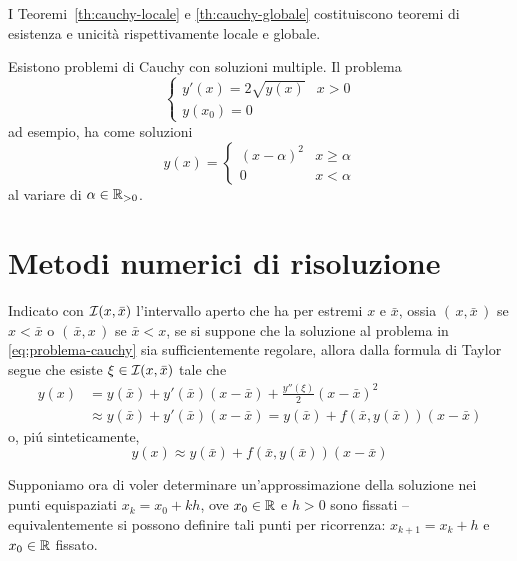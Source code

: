 	I Teoremi~\ref{th:cauchy-locale} e \ref{th:cauchy-globale} costituiscono teoremi di esistenza e unicità rispettivamente locale e globale.
	
	\begin{nota}
		Esistono problemi di Cauchy con soluzioni multiple. Il problema
		\begin{equation*}
			\begin{cases}
				y' (x) = 2 \sqrt{y (x)} & x > 0 \\
				y (x_0) = 0
			\end{cases}
		\end{equation*}
		ad esempio, ha come soluzioni
		\begin{equation*}
			y (x) =
			\begin{cases}
				(x - \alpha)^2 & x \ge \alpha \\
				0 & x < \alpha
			\end{cases}
		\end{equation*}
		al variare di \(\alpha \in \mathbb{R}_{> 0}\).
	\end{nota}

\section{Metodi numerici di risoluzione}
	
	\noindent Indicato con \(\mathcal{I} (x, \bar{x})\) l'intervallo aperto che ha per estremi \(x\) e \(\bar{x}\), ossia \((\, x, \bar{x} \,)\) se \(x < \bar{x}\) o \((\, \bar{x}, x \,)\) se \(\bar{x} < x\), se si suppone che la soluzione al problema in \eqref{eq:problema-cauchy} sia sufficientemente regolare, allora dalla formula di Taylor segue che esiste \(\xi \in \mathcal{I} (x, \bar{x})\) tale che
	\begin{equation*}
		\begin{split}
			y (x) &= y (\bar{x}) + y' (\bar{x}) (x - \bar{x}) + \frac{y'' (\xi)}{2} (x - \bar{x})^2 \\
			& \approx y (\bar{x}) + y' (\bar{x}) (x - \bar{x}) = y (\bar{x}) + f(\bar{x}, y (\bar{x})) (x - \bar{x})
		\end{split}
	\end{equation*}
	o, piú sinteticamente,
	\begin{equation}\label{eq:approx-prob-cauchy}
		y (x) \approx y (\bar{x}) + f (\bar{x}, y (\bar{x})) (x - \bar{x})
	\end{equation}
	
	Supponiamo ora di voler determinare un'approssimazione della soluzione nei punti equispaziati \(x_k = x_0 + k h\), ove \(x_0 \in \mathbb{R}\) e \(h > 0\) sono fissati -- equivalentemente si possono definire tali punti per ricorrenza: \(x_{k + 1} = x_k + h\) e \(x_0 \in \mathbb{R}\) fissato.
	
